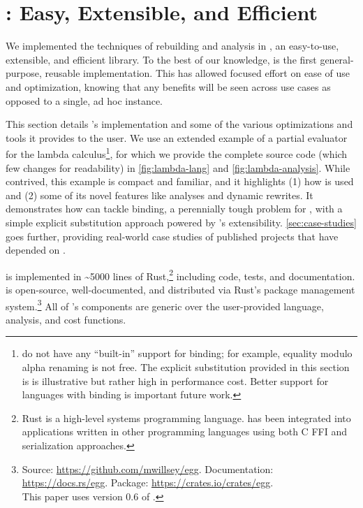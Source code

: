\chapter{\egg: Easy, Extensible, and Efficient \Egraphs}

\label{sec:egg}
\label{sec:impl}
\label{sec:lambda}

We implemented the techniques of rebuilding and \eclass analysis in \egg,
  an easy-to-use, extensible, and efficient \egraph library.
To the best of our knowledge,
  \egg is the first general-purpose, reusable \egraph implementation.
This has allowed focused effort on ease of use and optimization,
  knowing that any benefits will
  be seen across use cases as opposed to a single, ad hoc instance.

This section details \egg's implementation and some of the various
  optimizations and tools it provides to the user.
We use an extended example of a partial evaluator for the lambda calculus\footnote{
  \Egraphs do not have any ``built-in'' support for binding;
  for example, equality modulo alpha renaming is not free.
  The explicit substitution provided in this section is is illustrative but rather high in performance cost.
  Better support for languages with binding is important future work.
},
  for which we provide the complete source code (which few changes for readability)
  in \autoref{fig:lambda-lang} and \autoref{fig:lambda-analysis}.
While contrived, this example is compact and familiar, and it highlights
  (1) how \egg is used and (2) some of its novel features like
  \eclass analyses and dynamic rewrites.
It demonstrates how \egg can tackle binding,
  a perennially tough problem for \egraphs,
  with a simple explicit substitution approach
  powered by \egg's extensibility.
\autoref{sec:case-studies} goes further, providing real-world case studies of
  published projects that have depended on \egg.

\egg is implemented in \textasciitilde{}5000 lines of Rust,\footnote
{
  Rust \cite{rust} is a high-level systems programming language.
  \egg has been integrated into applications written in other
  programming languages using both C FFI and serialization approaches.
}
including code, tests, and documentation.
\egg is open-source, well-documented, and distributed via Rust's package
  management system.\footnote{
  Source: \url{https://github.com/mwillsey/egg}.
  Documentation: \url{https://docs.rs/egg}.
  Package: \url{https://crates.io/crates/egg}.
  \\
  This paper uses version 0.6 of \egg.
}
All of \egg's components are generic over the
  user-provided language, analysis, and cost functions.

